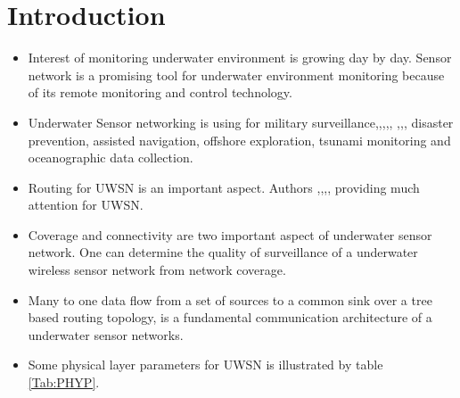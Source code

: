 \documentclass[12pt]{article}
\begin{document}
\section{Introduction}
\label{sec:intro}
\begin{itemize}[noitemsep]

\item Interest of monitoring underwater environment is growing day by day. Sensor network is a promising tool for underwater environment monitoring because of its remote monitoring and control technology. \item Underwater Sensor networking is using for military surveillance\cite{kong2005building},\cite{xiao2010underwater},\cite{pu2013comparing},\cite{wang2009token},\cite{zhang2008analysis}, \cite{bower1989evidence},\cite{bower1985gulf},\cite{regier1979float},\cite{flierl1981particle} disaster prevention, assisted navigation, offshore exploration, tsunami monitoring and oceanographic data collection. 

\item Routing for UWSN is an important aspect. Authors \cite{tung2014power},\cite{shen2014comparative},\cite{wahid2014mrp},\cite{du2014lb},\cite{ayaz2011survey} providing much attention for UWSN.

\item Coverage and connectivity are two important aspect of underwater sensor network\cite{ghosh2008coverage}. One can determine the quality of surveillance of a underwater wireless sensor network from network coverage. 
\item Many to one data flow from a set of sources to a common sink over a tree based routing topology, is a fundamental communication architecture of a underwater sensor networks.
\item Some physical layer parameters for UWSN is illustrated by table \ref{Tab:PHYP}.
\end{itemize}
\end{document}
